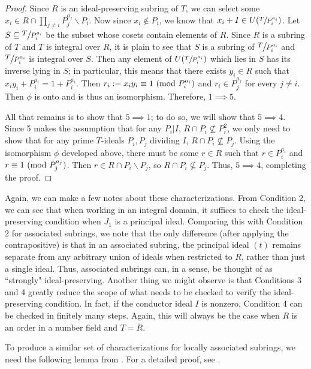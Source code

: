 \documentclass[12pt]{amsart}
\theoremstyle{definition}
\newcommand{\Rbar}{\overline{R}}
\newcommand{\modulo}[1]{\textup{ (mod }#1)}
\newcommand{\quot}[2]{\large\sfrac{#1}{#2}\normalsize}
\begin{document}
\begin{proof}
		Since $R$ is an ideal-preserving subring of $T$, we can select some $x_i\in R\cap \prod_{j\neq i}P_j^{a_j}\backslash P_i$. Now since $x_i\notin P_i$, we know that $x_i+I\in U(\sfrac{T}{P_i^{a_i}})$. Let $S\subseteq \quot{T}{P_i^{a_i}}$ be the subset whose cosets contain elements of $R$. Since $R$ is a subring of $T$ and $T$ is integral over $R$, it is plain to see that $S$ is a subring of $\quot{T}{P_i^{a_i}}$ and $\quot{T}{P_i^{a_i}}$ is integral over $S$. Then any element of $U(\sfrac{T}{P_i^{a_i}})$ which lies in $S$ has its inverse lying in $S$; in particular, this means that there exists $y_i\in R$ such that $x_iy_i+P_i^{a_i}=1+P_i^{a_i}$. Then $r_i:=x_iy_i\equiv 1\modulo{P_i^{a_i}}$ and $r_i\in P_j^{a_j}$ for every $j\neq i$. Then $\phi$ is onto and is thus an isomorphism. Therefore, $1\implies 5$.
		
		All that remains is to show that $5\implies 1$; to do so, we will show that $5\implies 4$. Since 5 makes the assumption that for any $P_i|I$, $R\cap P_i\nsubseteq P_i^2$, we only need to show that for any prime $T$-ideals $P_i,P_j$ dividing $I$, $R\cap P_i\nsubseteq P_j$. Using the isomorphism $\phi$ developed above, there must be some $r\in R$ such that $r\in P_i^{a_i}$ and $r\equiv 1\modulo{P_j^{a_j}}$. Then $r\in R\cap P_i\backslash P_j$, so $R\cap P_i\nsubseteq P_j$. Thus, $5\implies 4$, completing the proof. 
	\end{proof}
	
	Again, we can make a few notes about these characterizations. From Condition 2, we can see that when working in an integral domain, it suffices to check the ideal-preserving condition when $J_1$ is a principal ideal. Comparing this with Condition 2 for associated subrings, we note that the only difference (after applying the contrapositive) is that in an associated subring, the principal ideal $(t)$ remains separate from any arbitrary union of ideals when restricted to $R$, rather than just a single ideal. Thus, associated subrings can, in a sense, be thought of as ``strongly" ideal-preserving. Another thing we might observe is that Conditions 3 and 4 greatly reduce the scope of what needs to be checked to verify the ideal-preserving condition. In fact, if the conductor ideal $I$ is nonzero, Condition 4 can be checked in finitely many steps. Again, this will always be the case when $R$ is an order in a number field and $T=\Rbar$.
	
	To produce a similar set of characterizations for locally associated subrings, we need the following lemma from \cite{neukirch}. For a detailed proof, see \cite{thesis}.
	
\end{document}

